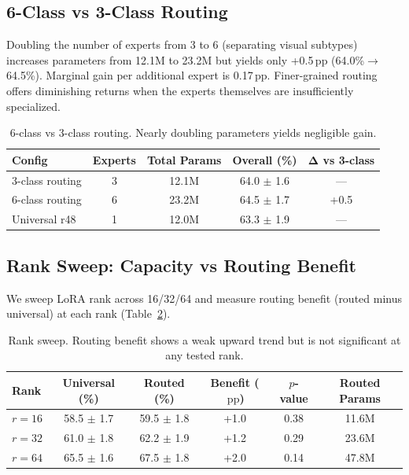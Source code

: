 \documentclass[letterpaper]{article}
\newcommand{\pp}{\,\text{pp}}
\begin{document}
\subsection{6-Class vs 3-Class Routing}
\label{sec:6class}

Doubling the number of experts from 3 to 6 (separating visual subtypes) increases parameters from 12.1M to 23.2M but yields only +0.5$\pp$ (64.0\%$\to$64.5\%). Marginal gain per additional expert is 0.17$\pp$. Finer-grained routing offers diminishing returns when the experts themselves are insufficiently specialized.

\begin{table}[h]
\centering
\caption{6-class vs 3-class routing. Nearly doubling parameters yields negligible gain.}
\label{tab:6class}
\small
\begin{tabular}{lcccc}
\toprule
\textbf{Config} & \textbf{Experts} & \textbf{Total Params} & \textbf{Overall (\%)} & $\boldsymbol{\Delta}$ \textbf{vs 3-class} \\
\midrule
3-class routing & 3 & 12.1M & 64.0 $\pm$ 1.6 & --- \\
6-class routing & 6 & 23.2M & 64.5 $\pm$ 1.7 & +0.5 \\
Universal r48 & 1 & 12.0M & 63.3 $\pm$ 1.9 & --- \\
\bottomrule
\end{tabular}
\end{table}

\subsection{Rank Sweep: Capacity vs Routing Benefit}
\label{sec:rank_sweep}

We sweep LoRA rank across 16/32/64 and measure routing benefit (routed minus universal) at each rank (Table~\ref{tab:rank_sweep}).

\begin{table}[h]
\centering
\caption{Rank sweep. Routing benefit shows a weak upward trend but is not significant at any tested rank.}
\label{tab:rank_sweep}
\small
\begin{tabular}{lccccc}
\toprule
\textbf{Rank} & \textbf{Universal (\%)} & \textbf{Routed (\%)} & \textbf{Benefit ($\pp$)} & \textbf{$p$-value} & \textbf{Routed Params} \\
\midrule
$r=16$ & 58.5 $\pm$ 1.7 & 59.5 $\pm$ 1.8 & +1.0 & 0.38 & 11.6M \\
$r=32$ & 61.0 $\pm$ 1.8 & 62.2 $\pm$ 1.9 & +1.2 & 0.29 & 23.6M \\
$r=64$ & 65.5 $\pm$ 1.6 & 67.5 $\pm$ 1.8 & +2.0 & 0.14 & 47.8M \\
\bottomrule
\end{tabular}
\end{table}
\end{document}
